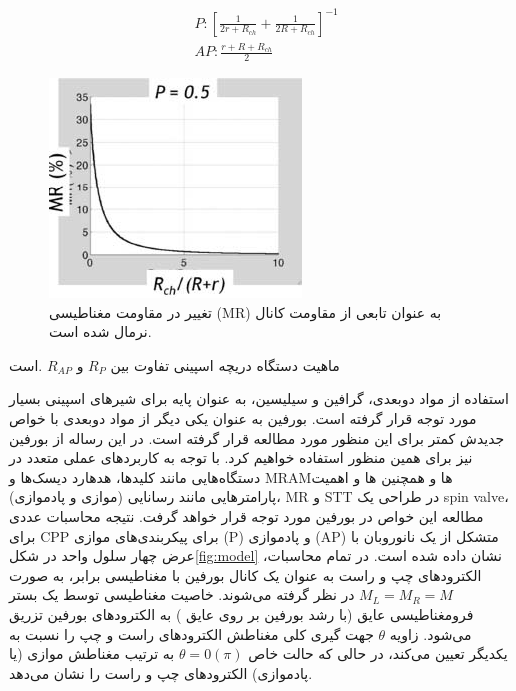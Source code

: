 
\begin{equation}
  \begin{aligned}
  & P:{{\left[ \frac{1}{2r+{{R}_{ch}}}+\frac{1}{2R+{{R}_{ch}}} \right]}^{-1}} \\ 
 & AP:\frac{r+R+{{R}_{ch}}}{2}  
  \end{aligned}
\end{equation}

\begin{figure}
  \centering
  \includegraphics{./figures/MR-theory.png}
  \caption{تغییر در مقاومت مغناطیسی (\gls{MR}) به عنوان تابعی از مقاومت کانال نرمال شده است.}
  \label{fig:MRtheory}
\end{figure}
ماهیت دستگاه دریچه اسپینی تفاوت بین $R_P$ و $R_{AP}$ .است 

استفاده از مواد دوبعدی، گرافین و سیلیسین، به عنوان پایه برای شیرهای اسپینی بسیار مورد توجه قرار گرفته است. ‌بورفین به عنوان یکی دیگر از مواد دوبعدی با خواص جدیدش کمتر برای این منظور مورد مطالعه قرار گرفته است. در این رساله از ‌بورفین نیز برای همین منظور استفاده خواهیم کرد. با توجه به کاربردهای عملی متعدد در دستگاه‌هایی مانند کلید‌ها، هد‌هارد دیسک‌ها و \gls{MRAM}ها و همچنین ‌ها و اهمیت پارامترهایی مانند رسانایی (موازی و پاد‌موازی)، \gls{MR} و \gls{STT} در طراحی یک \gls{spin valve}، مطالعه این خواص در ‌بورفین مورد توجه قرار خواهد گرفت. نتیجه محاسبات عددی برای \gls{CPP} برای پیکربندی‌های موازی (\gls{P})  و پاد‌موازی (\gls{AP})  متشکل از یک نانوروبان با عرض چهار سلول واحد در شکل\ref{fig:model} نشان داده شده است. در تمام محاسبات، الکترودهای چپ و راست به عنوان یک کانال ‌بورفین با مغناطیسی برابر، به صورت $M_L = M_R = M$ در نظر گرفته ‌‌می‌‌شوند. خاصیت مغناطیسی توسط یک بستر فرومغناطیسی عایق (با رشد ‌بورفین بر روی عایق ) به الکترودهای ‌بورفین تزریق ‌‌می‌‌شود. زاویه $\theta$ جهت گیری کلی مغناطش الکترودهای راست و چپ را نسبت به یکدیگر تعیین ‌‌می‌‌کند، در حالی که حالت خاص $\theta = 0 (\pi)$ به ترتیب مغناطش موازی (یا پاد‌موازی) الکترودهای چپ و راست را نشان ‌‌می‌‌دهد.

